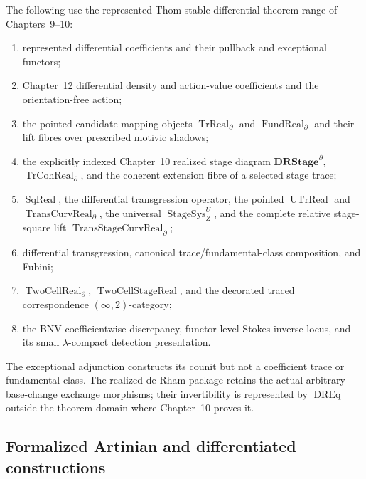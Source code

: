 The following use the represented Thom-stable differential theorem range of
Chapters~9--10:
\begin{enumerate}
\item represented differential coefficients and their pullback and exceptional
      functors;
\item Chapter~12 differential density and action-value coefficients and the
      orientation-free action;
\item the pointed candidate mapping objects $\operatorname{TrReal}_{\partial}$
      and $\operatorname{FundReal}_{\partial}$ and their lift fibres over
      prescribed motivic shadows;
\item the explicitly indexed Chapter~10 realized stage diagram
      $\mathbf{DRStage}^{\partial}$, $\operatorname{TrCohReal}_{\partial}$,
      and the coherent extension fibre of a selected stage trace;
\item $\operatorname{SqReal}$, the differential transgression operator,
      the pointed $\operatorname{UTrReal}$ and
      $\operatorname{TransCurvReal}_{\partial}$, the universal
      $\operatorname{StageSys}_Z^U$, and the complete relative stage-square
      lift $\operatorname{TransStageCurvReal}_{\partial}$;
\item differential transgression, canonical trace/fundamental-class composition,
      and Fubini;
\item $\operatorname{TwoCellReal}_{\partial}$,
      $\operatorname{TwoCellStageReal}$, and the decorated traced
      correspondence $(\infty,2)$-category;
\item the BNV coefficientwise discrepancy, functor-level Stokes inverse locus,
      and its small $\lambda$-compact detection presentation.
\end{enumerate}
The exceptional adjunction constructs its counit but not a coefficient trace or
fundamental class.  The realized de Rham package retains the actual arbitrary
base-change exchange morphisms; their invertibility is represented by
$\operatorname{DREq}$ outside the theorem domain where Chapter~10 proves it.

\subsection{Formalized Artinian and differentiated constructions}
\label{subsec:prequantum-audit-differentiated}

